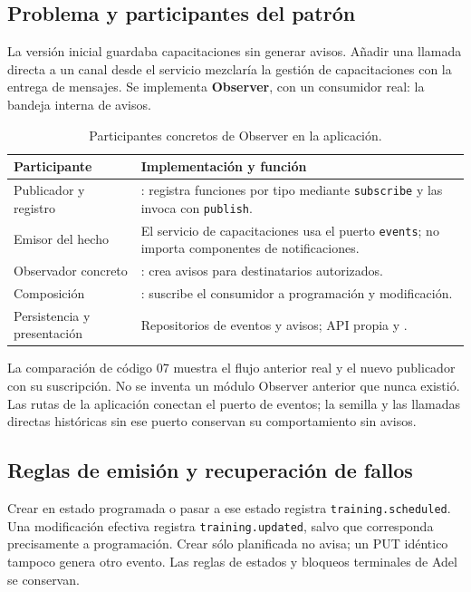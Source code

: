 \subsection{Problema y participantes del patrón}
La versión inicial guardaba capacitaciones sin generar avisos. Añadir una llamada
directa a un canal desde el servicio mezclaría la gestión de capacitaciones con la
entrega de mensajes. Se implementa \textbf{Observer}, con un consumidor real: la
bandeja interna de avisos.

\begingroup\setlength{\parskip}{0pt}
\begin{table}[htbp]\centering\small
\begin{tabular}{P{0.28\textwidth}P{0.64\textwidth}}
\toprule Participante & Implementación y función \\ \midrule
Publicador y registro & : registra funciones por tipo mediante \texttt{subscribe} y las invoca con \texttt{publish}. \\
Emisor del hecho & El servicio de capacitaciones usa el puerto \texttt{events}; no importa componentes de notificaciones. \\
Observador concreto & : crea avisos para destinatarios autorizados. \\
Composición & : suscribe el consumidor a programación y modificación. \\
Persistencia y presentación & Repositorios de eventos y avisos; API propia y . \\
\bottomrule
\end{tabular}
\caption{Participantes concretos de Observer en la aplicación.}
\end{table}\endgroup

La comparación de código 07 muestra el flujo anterior real y el nuevo publicador
con su suscripción. No se inventa un módulo Observer anterior que nunca existió.
Las rutas de la aplicación conectan el puerto de eventos; la semilla y las llamadas
directas históricas sin ese puerto conservan su comportamiento sin avisos.

\subsection{Reglas de emisión y recuperación de fallos}
Crear en estado programada o pasar a ese estado registra
\texttt{training.scheduled}. Una modificación efectiva registra
\texttt{training.updated}, salvo que corresponda precisamente a programación.
Crear sólo planificada no avisa; un PUT idéntico tampoco genera otro evento. Las
reglas de estados y bloqueos terminales de Adel se conservan.

